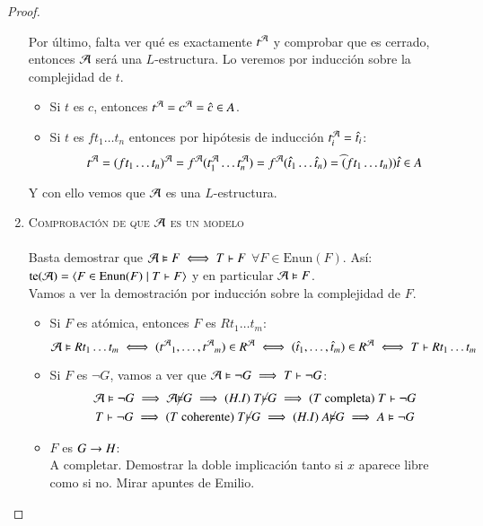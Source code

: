 \begin{proof}
\begin{enumerate}[(1)]
        Por último, falta ver qué es exactamente $t^{\mathcal{A}}$ y comprobar que es cerrado, entonces $\mathcal{A}$ será una $L$-estructura. Lo veremos por inducción sobre la complejidad de $t$.\\
        \begin{itemize}
            \item Si $t$ es $c$, entonces $t^{\mathcal{A}} = c^{\mathcal{A}} = \hat c \in A$.
            \item Si $t$ es $f t_1 \ldots t_n$ entonces por hipótesis de inducción $t_i^{\mathcal{A}} = \hat t_i$:
                $$
                    t^{\mathcal{A}} = (f t_1 \ldots t_n)^{\mathcal{A}} = f^{\mathcal{A}} (t_1 ^{\mathcal{A}} \ldots t_n^{\mathcal{A}}) = f^{\mathcal{A}} (\hat t_1 \ldots \hat t_n) = \widehat(f t_1 \ldots t_n) ) \hat t \in A
                $$
        \end{itemize}
        Y con ello vemos que $\mathcal{A}$ es una $L$-estructura.

        \item \textsc{Comprobación de que $\mathcal{A}$ es un modelo}\\\\
        Basta demostrar que $\mathcal{A} \vDash F \iff T \vdash F$ $\forall F \in \mathrm{Enun}(F)$. Así: $\mathrm{te}(\mathcal{A}) = \langle F \in \mathrm{Enun}(F) \mid T\vdash F\rangle$ y en particular $\mathcal{A} \vDash F$.\\
        Vamos a ver la demostración por inducción sobre la complejidad de $F$.
        \begin{itemize}
            \item Si $F$ es atómica, entonces $F$ es $R t_1 \ldots t_m$:
            $$
                \mathcal{A} \vDash R t_1 \ldots t_m \iff ({t^{\mathcal{A}}}_{1}, \ldots, {t^{\mathcal{A}}}_{m})\in R^{\mathcal{A}} \iff ({\hat t}_{1}, \ldots, {\hat t}_{m})\in R^{\mathcal{A}} \iff T \vdash R t_1 \ldots t_m
            $$
            \item Si $F$ es $\neg G$, vamos a ver que $\mathcal{A} \vDash \neg G \implies T \vdash \neg G$:
            \begin{gather}
                \mathcal{A} \vDash \neg G \implies \mathcal{A} \cancel\vDash G \implies (H.I)\ T \cancel\vdash G \implies\text{($T$ completa) } T \vdash \neg G\\
                T\vdash \neg G \implies\text{($T$ coherente) } T \cancel\vdash G \implies (H.I)\ A \cancel\vDash G \implies A \vDash \neg G
            \end{gather}
            \item $F$ es $G \rightarrow H$:\\
            A completar. Demostrar la doble implicación tanto si $x$ aparece libre como si no. Mirar apuntes de Emilio.
        \end{itemize}
    \end{enumerate}
\end{proof}

